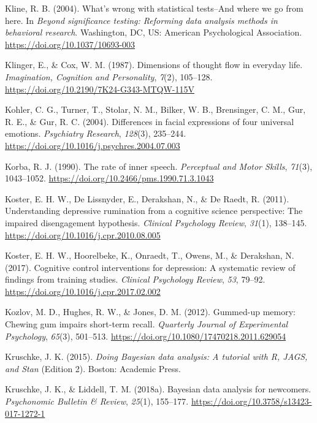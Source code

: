 \documentclass[a4paper,12pt,twoside,onecolumn,openright,final,oldfontcommands]{memoir}
\begin{document}
\leavevmode\hypertarget{ref-Kline2004}{}%
Kline, R. B. (2004). What's wrong with statistical tests--And where we go from here. In \emph{Beyond significance testing: Reforming data analysis methods in behavioral research}. Washington, DC, US: American Psychological Association. \url{https://doi.org/10.1037/10693-003}

\leavevmode\hypertarget{ref-klinger_dimensions_1987}{}%
Klinger, E., \& Cox, W. M. (1987). Dimensions of thought flow in everyday life. \emph{Imagination, Cognition and Personality}, \emph{7}(2), 105--128. \url{https://doi.org/10.2190/7K24-G343-MTQW-115V}

\leavevmode\hypertarget{ref-kohler_differences_2004}{}%
Kohler, C. G., Turner, T., Stolar, N. M., Bilker, W. B., Brensinger, C. M., Gur, R. E., \& Gur, R. C. (2004). Differences in facial expressions of four universal emotions. \emph{Psychiatry Research}, \emph{128}(3), 235--244. \url{https://doi.org/10.1016/j.psychres.2004.07.003}

\leavevmode\hypertarget{ref-korba_rate_1990}{}%
Korba, R. J. (1990). The rate of inner speech. \emph{Perceptual and Motor Skills}, \emph{71}(3), 1043--1052. \url{https://doi.org/10.2466/pms.1990.71.3.1043}

\leavevmode\hypertarget{ref-Koster2011}{}%
Koster, E. H. W., De Lissnyder, E., Derakshan, N., \& De Raedt, R. (2011). Understanding depressive rumination from a cognitive science perspective: The impaired disengagement hypothesis. \emph{Clinical Psychology Review}, \emph{31}(1), 138--145. \url{https://doi.org/10.1016/j.cpr.2010.08.005}

\leavevmode\hypertarget{ref-koster_cognitive_2017}{}%
Koster, E. H. W., Hoorelbeke, K., Onraedt, T., Owens, M., \& Derakshan, N. (2017). Cognitive control interventions for depression: A systematic review of findings from training studies. \emph{Clinical Psychology Review}, \emph{53}, 79--92. \url{https://doi.org/10.1016/j.cpr.2017.02.002}

\leavevmode\hypertarget{ref-kozlov_gummed-up_2012}{}%
Kozlov, M. D., Hughes, R. W., \& Jones, D. M. (2012). Gummed-up memory: Chewing gum impairs short-term recall. \emph{Quarterly Journal of Experimental Psychology}, \emph{65}(3), 501--513. \url{https://doi.org/10.1080/17470218.2011.629054}

\leavevmode\hypertarget{ref-kruschke_doing_2015}{}%
Kruschke, J. K. (2015). \emph{Doing Bayesian data analysis: A tutorial with R, JAGS, and Stan} (Edition 2). Boston: Academic Press.

\leavevmode\hypertarget{ref-kruschke_bayesian_2018}{}%
Kruschke, J. K., \& Liddell, T. M. (2018a). Bayesian data analysis for newcomers. \emph{Psychonomic Bulletin \& Review}, \emph{25}(1), 155--177. \url{https://doi.org/10.3758/s13423-017-1272-1}
\end{document}
